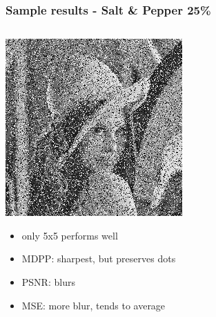 \documentclass{beamer}
\begin{document}
		\begin{frame}[t,fragile]
		\frametitle{Sample results - Salt \& Pepper 25\%}
		
		\begin{columns}[onlytextwidth]
			\begin{column}{0.3\textwidth}
				\includegraphics[width=\textwidth]{img/original25.jpg}
				\vspace{3.5mm}
				\scriptsize
				\begin{itemize}
					\item only 5x5 performs well
					\item MDPP: sharpest, but preserves dots
					\item PSNR: blurs
					\item MSE: more blur, tends to average
				\end{itemize}
			\end{column}


\end{columns}
\end{frame}
\end{document}
